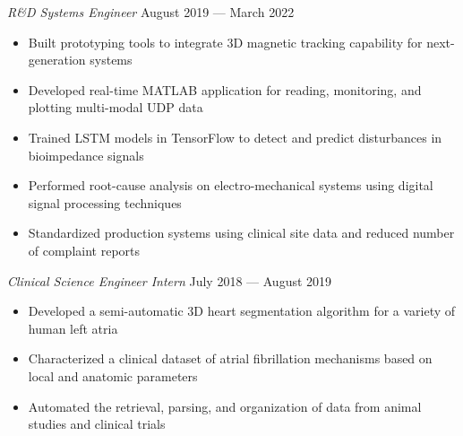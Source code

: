 \documentclass{article}
\begin{document}
\textit{R\&D Systems Engineer} \hfill August 2019 --- March 2022\\
\vspace{-2mm}
\begin{itemize} \itemsep 0.05pt
	\item Built prototyping tools to integrate 3D magnetic tracking capability for next-generation systems
	\item Developed real-time MATLAB application for reading, monitoring, and plotting multi-modal UDP data
	\item Trained LSTM models in TensorFlow to detect and predict disturbances in bioimpedance signals
	\item Performed root-cause analysis on electro-mechanical systems using digital signal processing techniques
	\item Standardized production systems using clinical site data and reduced number of complaint reports
\end{itemize}

\textit{Clinical Science Engineer Intern} \hfill July 2018 --- August 2019\\
\vspace{-2mm}
\begin{itemize} \itemsep 0.05pt
	\item Developed a semi-automatic 3D heart segmentation algorithm for a variety of human left atria
	\item Characterized a clinical dataset of atrial fibrillation mechanisms based on local and anatomic parameters
	\item Automated the retrieval, parsing, and organization of data from animal studies and clinical trials
\end{itemize}




\end{document}
